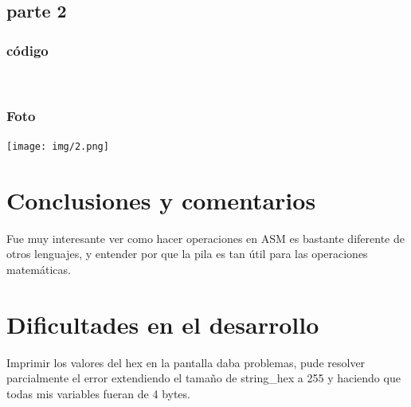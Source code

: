 \documentclass[12pt]{article}
\begin{document}
\subsection*{parte 2}
\label{sec:org8cc082a}
\subsubsection*{código}
\label{sec:org509b4b8}
\\ 

\subsubsection*{Foto}
\label{sec:org92d4c64}
\begin{center}
\texttt{[image: img/2.png]}
\end{center}

\section*{Conclusiones y comentarios}
\label{sec:org3c344c5}
Fue muy interesante ver como hacer operaciones en ASM es bastante diferente de otros lenguajes, y entender por que la pila es tan útil para las operaciones matemáticas.

\section*{Dificultades en el desarrollo}
\label{sec:orgc7584d5}
Imprimir los valores del hex en la pantalla daba problemas, pude resolver parcialmente el error extendiendo el tamaño de string\_hex a 255 y haciendo que todas mis variables fueran de 4 bytes.
\end{document}
